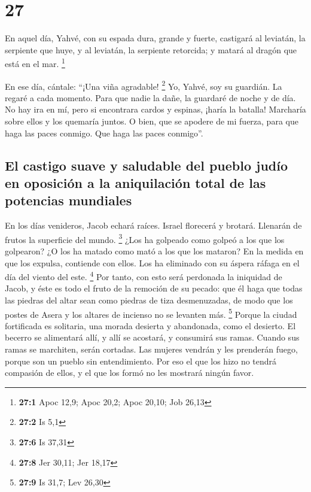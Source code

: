 \hypertarget{section-26}{%
\section{27}\label{section-26}}

 En aquel día, Yahvé, con su espada dura, grande y fuerte,
castigará al leviatán, la serpiente que huye, y al leviatán, la
serpiente retorcida; y matará al dragón que está en el mar. \footnote{\textbf{27:1}
  Apoc 12,9; Apoc 20,2; Apoc 20,10; Job 26,13}

 En ese día, cántale: ``¡Una viña agradable! \footnote{\textbf{27:2}
  Is 5,1}  Yo, Yahvé, soy su guardián. La regaré a cada
momento. Para que nadie la dañe, la guardaré de noche y de día.
 No hay ira en mí, pero si encontrara cardos y espinas,
¡haría la batalla! Marcharía sobre ellos y los quemaría juntos.
 O bien, que se apodere de mi fuerza, para que haga las
paces conmigo. Que haga las paces conmigo''.

\hypertarget{el-castigo-suave-y-saludable-del-pueblo-juduxedo-en-oposiciuxf3n-a-la-aniquilaciuxf3n-total-de-las-potencias-mundiales}{%
\subsection{El castigo suave y saludable del pueblo judío en oposición a
la aniquilación total de las potencias
mundiales}\label{el-castigo-suave-y-saludable-del-pueblo-juduxedo-en-oposiciuxf3n-a-la-aniquilaciuxf3n-total-de-las-potencias-mundiales}}

 En los días venideros, Jacob echará raíces. Israel
florecerá y brotará. Llenarán de frutos la superficie del mundo.
\footnote{\textbf{27:6} Is 37,31}  ¿Los ha golpeado como
golpeó a los que los golpearon? ¿O los ha matado como mató a los que los
mataron?  En la medida en que los expulsa, contiende con
ellos. Los ha eliminado con su áspera ráfaga en el día del viento del
este. \footnote{\textbf{27:8} Jer 30,11; Jer 18,17}  Por
tanto, con esto será perdonada la iniquidad de Jacob, y éste es todo el
fruto de la remoción de su pecado: que él haga que todas las piedras del
altar sean como piedras de tiza desmenuzadas, de modo que los postes de
Asera y los altares de incienso no se levanten más. \footnote{\textbf{27:9}
  Is 31,7; Lev 26,30}  Porque la ciudad fortificada es
solitaria, una morada desierta y abandonada, como el desierto. El
becerro se alimentará allí, y allí se acostará, y consumirá sus ramas.
 Cuando sus ramas se marchiten, serán cortadas. Las
mujeres vendrán y les prenderán fuego, porque son un pueblo sin
entendimiento. Por eso el que los hizo no tendrá compasión de ellos, y
el que los formó no les mostrará ningún favor.

